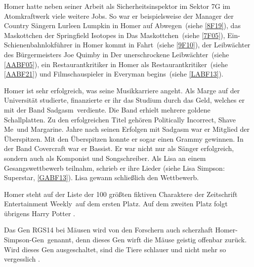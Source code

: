 Homer hatte neben seiner Arbeit als Sicherheitsinspektor im Sektor 7G im Atomkraftwerk viele weitere Jobs. So war er beispielsweise der Manager der Country Sängern Lurleen Lumpkin in \glqq Homer auf Abwegen\grqq\ (siehe \ref{8F19}), das Mas\-kott\-chen der Spring\-field Isotopes in \glqq Das Maskottchen\grqq\ (siehe \ref{7F05}), Ein-Schienenbahnlokführer in \glqq Homer kommt in Fahrt\grqq\ (siehe \ref{9F10}), der Leib\-wäch\-ter des Bürgermeisters Joe Quimby in \glqq Der unerschrockene Leibwächter\grqq\ (siehe \ref{AABF05}), ein Restaurantkritiker in \glqq Homer als Restaurantkritiker\grqq\ (siehe \ref{AABF21}) und Filmschauspieler in \glqq Everyman begins\grqq\ (siehe \ref{LABF13}).

Homer ist sehr erfolgreich, was seine Musikkarriere angeht. Als Marge auf der Universität studierte, finanzierte er ihr das Studium durch das Geld, welches er mit der Band \glqq Sadgasm\grqq\ verdiente. Die Band erhielt mehrere goldene Schallplatten. Zu den erfolgreichen Titel gehören \glqq Politically Incorrect\grqq , \glqq Shave Me\grqq\ und \glqq Margarine\grqq . Jahre nach seinen Erfolgen mit Sadgasm war er Mitglied der \glqq Überspitzen\grqq . Mit den Überspitzen konnte er sogar einen Grammy gewinnen. In der Band Covercraft war er Bassist. Er war nicht nur als Sänger erfolgreich, sondern auch als Komponist und Songschreiber. Als Lisa an einem Gesangswettbewerb teilnahm, schrieb er ihre Lieder (siehe \glqq Lisa Simpson: Superstar\grqq , \ref{GABF13}). Lisa gewann schließlich den Wettbewerb.

Homer steht auf der Liste der 100 größten fiktiven Charaktere der Zeitschrift \glqq Entertainment Weekly\grqq\ auf dem ersten Platz. Auf dem zweiten Platz folgt übrigens Harry Potter \cite{GreatestCharacters}. 

Das Gen RGS14 bei Mäusen wird von den Forschern auch scherzhaft \glqq Homer-Simpson-Gen\grqq\ genannt, denn dieses Gen wirft die Mäuse geistig offenbar zurück. Wird dieses Gen ausgeschaltet, sind die Tiere schlauer und nicht mehr so vergesslich \cite{HomerSimpsonGen}.

